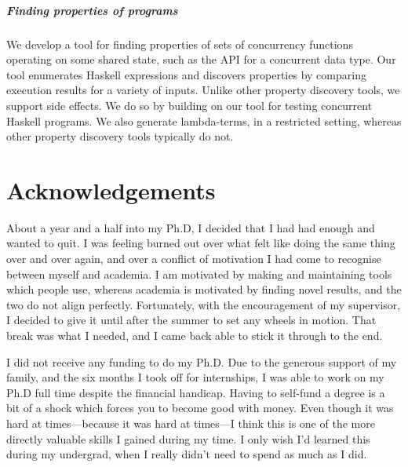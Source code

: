 \paragraph{Finding properties of programs}
We develop a tool for finding properties of sets of concurrency
functions operating on some shared state, such as the API for a
concurrent data type.  Our tool enumerates Haskell expressions and
discovers properties by comparing execution results for a variety of
inputs.  Unlike other property discovery tools, we support side
effects.  We do so by building on our tool for testing concurrent
Haskell programs.  We also generate lambda-terms, in a restricted
setting, whereas other property discovery tools typically do not.

\makeatletter\renewcommand{}\makeatother
\tableofcontents
\listoffigures
\listoftables
\listoflistings

\chapter*{Acknowledgements}

About a year and a half into my Ph.D, I decided that I had had enough
and wanted to quit.  I was feeling burned out over what felt like
doing the same thing over and over again, and over a conflict of
motivation I had come to recognise between myself and academia.  I am
motivated by making and maintaining tools which people use, whereas
academia is motivated by finding novel results, and the two do not
align perfectly.  Fortunately, with the encouragement of my
supervisor, I decided to give it until after the summer to set any
wheels in motion.  That break was what I needed, and I came back able
to stick it through to the end.

I did not receive any funding to do my Ph.D.  Due to the generous
support of my family, and the six months I took off for internships, I
was able to work on my Ph.D full time despite the financial handicap.
Having to self-fund a degree is a bit of a shock which forces you to
become good with money.  Even though it was hard at times---because it
was hard at times---I think this is one of the more directly valuable
skills I gained during my time.  I only wish I'd learned this during
my undergrad, when I really didn't need to spend as much as I did.

